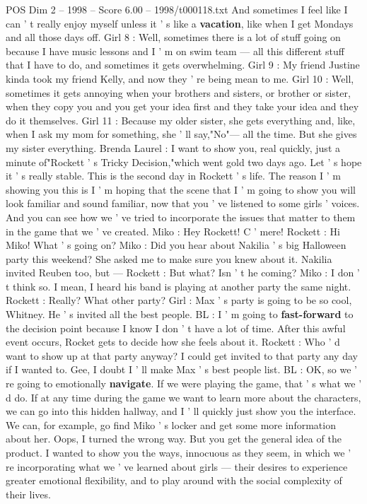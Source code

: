 \begin{textsample}{POS Dim 2 – 1998 – Score 6.00 – 1998/t000118.txt}
And sometimes I feel like I can ' t really enjoy myself unless it ' s like a \textbf{vacation}, like when I get Mondays and all those days off.
Girl 8 : Well, sometimes there is a lot of stuff going on because I have music lessons and I ' m on swim team — all this different stuff that I have to do, and sometimes it gets overwhelming.
Girl 9 : My friend Justine kinda took my friend Kelly, and now they ' re being mean to me.
Girl 10 : Well, sometimes it gets annoying when your brothers and sisters, or brother or sister, when they copy you and you get your idea first and they take your idea and they do it themselves.
Girl 11 : Because my older sister, she gets everything and, like, when I ask my mom for something, she ' ll say,"No"— all the time.
But she gives my sister everything.
Brenda Laurel : I want to show you, real quickly, just a minute of"Rockett ' s Tricky Decision,"which went gold two days ago.
Let ' s hope it ' s really stable.
This is the second day in Rockett ' s life.
The reason I ' m showing you this is I ' m hoping that the scene that I ' m going to show you will look familiar and sound familiar, now that you ' ve listened to some girls ' voices.
And you can see how we ' ve tried to incorporate the issues that matter to them in the game that we ' ve created.
Miko : Hey Rockett!
C ' mere!
Rockett : Hi Miko!
What ' s going on?
Miko : Did you hear about Nakilia ' s big Halloween party this weekend?
She asked me to make sure you knew about it.
Nakilia invited Reuben too, but — Rockett : But what?
Isn ' t he coming?
Miko : I don ' t think so.
I mean, I heard his band is playing at another party the same night.
Rockett : Really?
What other party?
Girl : Max ' s party is going to be so cool, Whitney.
He ' s invited all the best people.
BL : I ' m going to \textbf{fast-forward} to the decision point because I know I don ' t have a lot of time.
After this awful event occurs, Rocket gets to decide how she feels about it.
Rockett : Who ' d want to show up at that party anyway?
I could get invited to that party any day if I wanted to.
Gee, I doubt I ' ll make Max ' s best people list.
BL : OK, so we ' re going to emotionally \textbf{navigate}.
If we were playing the game, that ' s what we ' d do.
If at any time during the game we want to learn more about the characters, we can go into this hidden hallway, and I ' ll quickly just show you the interface.
We can, for example, go find Miko ' s locker and get some more information about her.
Oops, I turned the wrong way.
But you get the general idea of the product.
I wanted to show you the ways, innocuous as they seem, in which we ' re incorporating what we ' ve learned about girls — their desires to experience greater emotional flexibility, and to play around with the social complexity of their lives.

\end{textsample}
